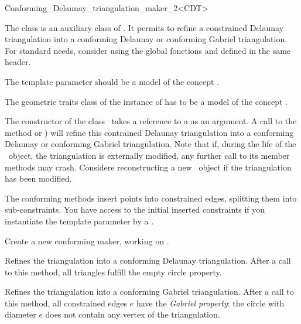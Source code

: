 \begin{ccRefClass}{Conforming_Delaunay_triangulation_maker_2<CDT>}

The class \ccRefName{} is an auxiliary class of
. It permits to refine a constrained
Delaunay triangulation into a conforming Delaunay or conforming
Gabriel triangulation. For standard needs, consider using the global
fonctions  and
 defined in the same header.

\ccParameters 

The template parameter  should be a model of the concept
.

The geometric traits class of the instance of  has to be
a model of the concept .


The constructor of the class \ccRefName\ takes a reference to a 
as an argument. A call to the method 
or ) will refine this contrained
Delaunay triangulation into a conforming Delaunay or conforming
Gabriel triangulation. Note that if, during the life of the \ccRefName\ 
object, the triangulation is externally modified, any further call to its
member methods may crash. Considere reconstructing a new \ccRefName\ object
if the triangulation has been modified.

The conforming methods insert points into constrained edges, splitting
them into sub-constraints. You have access to the initial inserted
constraints if you instantiate the template parameter by a
.


\ccCreation
{}

{Create a new conforming maker, working on \ccc{t}.}

\ccOperations


{ Refines the triangulation into a conforming Delaunay triangulation.
  After a call to this method, all triangles fulfill the empty circle
  property. }

{ Refines the triangulation into a conforming Gabriel triangulation.
  After a call to this method, all constrained edges $e$ have the
  \emph{Gabriel property}: the circle with diameter $e$ 
  does not contain any vertex of the triangulation. }


\end{ccRefClass}
